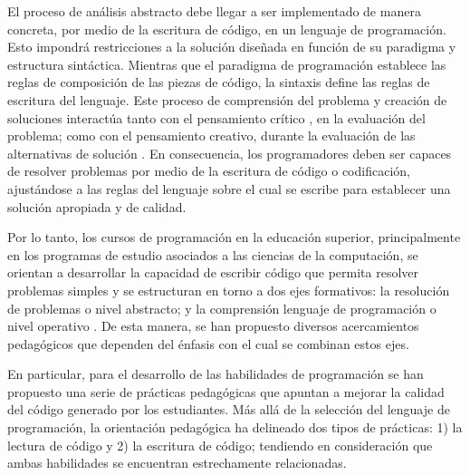 \documentclass[spanish]{textolivre}
\begin{document}
El proceso de análisis abstracto debe llegar a ser implementado de manera concreta, por medio de la escritura de código, en un lenguaje de programación. Esto impondrá restricciones a la solución diseñada en función de su paradigma y estructura sintáctica. Mientras que  el paradigma de programación establece las reglas de composición de las piezas de código, la sintaxis define las reglas de escritura del lenguaje. Este proceso de comprensión del problema y creación de soluciones interactúa tanto con el pensamiento crítico \cite{bastias2021evaluation}, en la evaluación del problema; como con el pensamiento creativo, durante la evaluación de las alternativas de solución \cite{eguiluz2017exploring, groeneveld2022undergraduate}. En consecuencia, los programadores deben ser capaces de resolver problemas por medio de la escritura de código o codificación, ajustándose a las reglas del lenguaje sobre el cual se escribe para establecer una solución apropiada y de calidad. 

Por lo tanto, los cursos de programación en la educación superior, principalmente en los programas de estudio asociados a las ciencias de la computación, se orientan a desarrollar la capacidad de escribir código que permita resolver problemas simples y se estructuran en torno a dos ejes formativos: la resolución de problemas o nivel abstracto; y la comprensión lenguaje de programación o nivel operativo \cite{iqbal2021web}. De esta manera, se han propuesto diversos acercamientos pedagógicos que dependen del énfasis con el cual se combinan estos ejes. 

En particular, para el desarrollo de las habilidades de programación se han propuesto una serie de prácticas pedagógicas que apuntan a mejorar la calidad del código generado por los estudiantes. Más allá de la selección del lenguaje de programación, la orientación pedagógica ha delineado dos tipos de prácticas: 1) la lectura de código y 2) la escritura de código; tendiendo en consideración que ambas habilidades se encuentran estrechamente relacionadas. 
\end{document}
